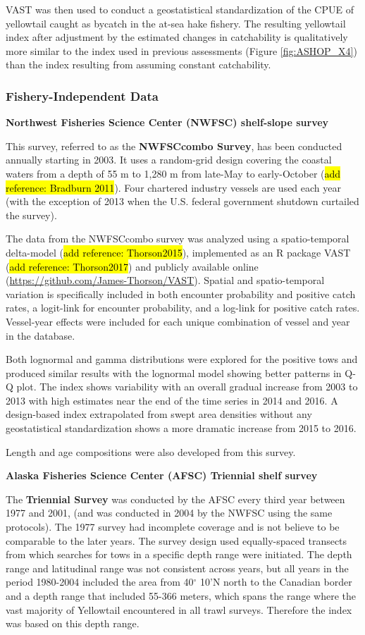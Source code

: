 \documentclass[12pt,]{article}
\begin{document}
VAST was then used to conduct a geostatistical standardization of the
CPUE of yellowtail caught as bycatch in the at-sea hake fishery. The
resulting yellowtail index after adjustment by the estimated changes in
catchability is qualitatively more similar to the index used in previous
assessments (Figure \ref{fig:ASHOP_X4}) than the index resulting from
assuming constant catchability.

\subsubsection{Fishery-Independent Data}\label{fishery-independent-data}

\textbf{Northwest Fisheries Science Center (NWFSC) shelf-slope survey}

This survey, referred to as the \textbf{NWFSCcombo Survey}, has been
conducted annually starting in 2003. It uses a random-grid design
covering the coastal waters from a depth of 55 m to 1,280 m from
late-May to early-October (\hl{add reference: Bradburn 2011}). Four
chartered industry vessels are used each year (with the exception of
2013 when the U.S. federal government shutdown curtailed the survey).

The data from the NWFSCcombo survey was analyzed using a spatio-temporal
delta-model (\hl{add reference: Thorson2015}), implemented as an R
package VAST (\hl{add reference: Thorson2017}) and publicly available
online (\url{https://github.com/James-Thorson/VAST}). Spatial and
spatio-temporal variation is specifically included in both encounter
probability and positive catch rates, a logit-link for encounter
probability, and a log-link for positive catch rates. Vessel-year
effects were included for each unique combination of vessel and year in
the database.

Both lognormal and gamma distributions were explored for the positive
tows and produced similar results with the lognormal model showing
better patterns in Q-Q plot. The index shows variability with an overall
gradual increase from 2003 to 2013 with high estimates near the end of
the time series in 2014 and 2016. A design-based index extrapolated from
swept area densities without any geostatistical standardization shows a
more dramatic increase from 2015 to 2016.

Length and age compositions were also developed from this survey.

\textbf{Alaska Fisheries Science Center (AFSC) Triennial shelf survey}

The \textbf{Triennial Survey} was conducted by the AFSC every third year
between 1977 and 2001, (and was conducted in 2004 by the NWFSC using the
same protocols). The 1977 survey had incomplete coverage and is not
believe to be comparable to the later years. The survey design used
equally-spaced transects from which searches for tows in a specific
depth range were initiated. The depth range and latitudinal range was
not consistent across years, but all years in the period 1980-2004
included the area from 40\(^\circ\) 10'N north to the Canadian border
and a depth range that included 55-366 meters, which spans the range
where the vast majority of Yellowtail encountered in all trawl surveys.
Therefore the index was based on this depth range.
\end{document}
